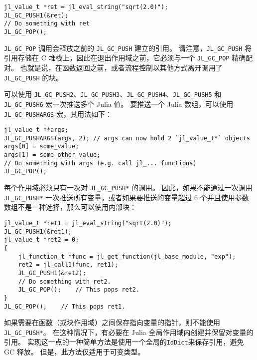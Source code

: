 \begin{lstlisting}
jl_value_t *ret = jl_eval_string("sqrt(2.0)");
JL_GC_PUSH1(&ret);
// Do something with ret
JL_GC_POP();
\end{lstlisting}



\texttt{JL\_GC\_POP} 调用会释放之前的 \texttt{JL\_GC\_PUSH} 建立的引用。 请注意，\texttt{JL\_GC\_PUSH} 将引用存储在 C 堆栈上，因此在退出作用域之前，它必须与一个 \texttt{JL\_GC\_POP} 精确配对。 也就是说，在函数返回之前，或者流程控制以其他方式离开调用了\texttt{JL\_GC\_PUSH} 的块。



可以使用 \texttt{JL\_GC\_PUSH2}、\texttt{JL\_GC\_PUSH3}、\texttt{JL\_GC\_PUSH4}、\texttt{JL\_GC\_PUSH5} 和 \texttt{JL\_GC\_PUSH6} 宏一次推送多个 Julia 值。 要推送一个 Julia 数组，可以使用 \texttt{JL\_GC\_PUSHARGS} 宏，其用法如下：




\begin{lstlisting}
jl_value_t **args;
JL_GC_PUSHARGS(args, 2); // args can now hold 2 `jl_value_t*` objects
args[0] = some_value;
args[1] = some_other_value;
// Do something with args (e.g. call jl_... functions)
JL_GC_POP();
\end{lstlisting}



每个作用域必须只有一次对 \texttt{JL\_GC\_PUSH*} 的调用。 因此，如果不能通过一次调用\texttt{JL\_GC\_PUSH*} 一次推送所有变量，或者如果要推送的变量超过 6 个并且使用参数数组不是一种选择，那么可以使用内部块：




\begin{lstlisting}
jl_value_t *ret1 = jl_eval_string("sqrt(2.0)");
JL_GC_PUSH1(&ret1);
jl_value_t *ret2 = 0;
{
    jl_function_t *func = jl_get_function(jl_base_module, "exp");
    ret2 = jl_call1(func, ret1);
    JL_GC_PUSH1(&ret2);
    // Do something with ret2.
    JL_GC_POP();    // This pops ret2.
}
JL_GC_POP();    // This pops ret1.
\end{lstlisting}



如果需要在函数（或块作用域）之间保存指向变量的指针，则不能使用 \texttt{JL\_GC\_PUSH*}。 在这种情况下，有必要在 Julia 全局作用域内创建并保留对变量的引用。 实现这一点的一种简单方法是使用一个全局的\texttt{IdDict}来保存引用，避免 GC 释放。 但是，此方法仅适用于可变类型。




